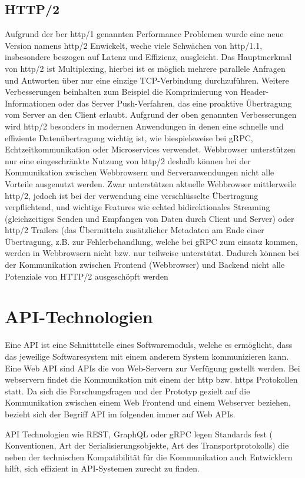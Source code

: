\subsection{HTTP/2}
Aufgrund der ber http/1 genannten Performance Problemen wurde eine neue Version namens http/2 Enwickelt, weche viele Schwächen von http/1.1, insbesondere beszogen auf Latenz und Effizienz, ausgleicht.
Das Hauptmerkmal von http/2 ist Multiplexing, hierbei ist es möglich mehrere parallele Anfragen und Antworten über nur eine einzige TCP-Verbindung durchzuführen.
Weitere Verbesserungen beinhalten zum Beispiel die Komprimierung von Header-Informationen oder das Server Push-Verfahren, das eine proaktive Übertragung vom Server an den Client erlaubt.
Aufgrund der oben genannten Verbesserungen wird http/2 besonders in modernen Anwendungen in denen eine schnelle und effiziente Datenübertragung wichtig ist, wie biespielsweise bei gRPC, Echtzeitkommunikation oder Microservices verwendet.
Webbrowser unterstützen nur eine eingeschränkte Nutzung von http/2 deshalb können bei der Kommunikation zwischen Webbrowsern und Serveranwendungen nicht alle Vorteile ausgenutzt werden. Zwar unterstützen aktuelle Webbrowser mittlerweile http/2, jedoch ist bei der verwendung eine verschlüsselte Übertragung verpflichtend, und wichtige Features wie echted bidirektionales Streaming (gleichzeitiges Senden und Empfangen von Daten durch Client und Server) oder http/2 Trailers (das Übermitteln zusätzlicher Metadaten am Ende einer Übertragung, z.B. zur Fehlerbehandlung, welche bei gRPC zum einsatz kommen, werden in Webbrowsern nicht bzw. nur teilweise unterstützt. Dadurch können bei der Kommunikation zwischen Frontend (Webbrowser) und Backend nicht alle Potenziale von HTTP/2 ausgeschöpft werden 


\section{API-Technologien}
Eine API ist eine Schnittstelle eines Softwaremoduls, welche es ermöglicht, dass das jeweilige Softwaresystem mit einem anderem System kommunizieren kann.
Eine Web API sind APIs die von Web-Servern zur Verfügung gestellt werden. Bei webservern findet die Kommunikation mit einem der http bzw. https Protokollen statt. Da sich die Forschungsfragen und der Prototyp gezielt auf die Kommunikation zwischen einem Web Frontend und einem Webserver beziehen, bezieht sich der Begriff API im folgenden immer auf Web APIs.

API Technologien wie REST, GraphQL oder gRPC legen Standards fest ( Konventionen, Art der Serialisierungsobjekte, Art des Transportprotokolls) die neben der technischen Kompatibilität für die Kommunikation auch Entwicklern hilft, sich effizient in API-Systemen zurecht zu finden.


